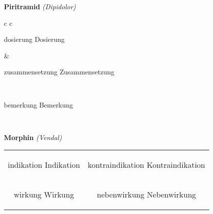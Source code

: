 \documentclass[12pt]{beamer}
\begin{document}
\begin{frame}{
    \textbf{Piritramid}
    \textit{(Dipidolor)}
}
    \begin{tabular}{c c}
        \begin{beamercolorbox}[wd=\boxwidth\textwidth,ht=\boxheight\textheight,sep=1em]{dosierung}
        Dosierung
        \end{beamercolorbox} & 
        \begin{beamercolorbox}[wd=\boxwidth\textwidth,ht=\boxheight\textheight,sep=1em]{zusammensetzung}
        Zusammensetzung
        \end{beamercolorbox} \\
        \begin{beamercolorbox}[wd=\textwidth,ht=\boxheight\textheight,sep=1em]{bemerkung}
        Bemerkung
        \end{beamercolorbox} \\
    \end{tabular}
\end{frame}

\begin{frame}{
    \textbf{Morphin}
    \textit{(Vendal)}
}
    \begin{tabular}{c c}
        \begin{beamercolorbox}[wd=\boxwidth\textwidth,ht=\boxheight\textheight,sep=1em]{indikation}
        Indikation
        \end{beamercolorbox} & 
        \begin{beamercolorbox}[wd=\boxwidth\textwidth,ht=\boxheight\textheight,sep=1em]{kontraindikation}
        Kontraindikation 
        \end{beamercolorbox} \\
        \begin{beamercolorbox}[wd=\boxwidth\textwidth,ht=\boxheight\textheight,sep=1em]{wirkung}
        Wirkung
        \end{beamercolorbox} & 
        \begin{beamercolorbox}[wd=\boxwidth\textwidth,ht=\boxheight\textheight,sep=1em]{nebenwirkung}
        Nebenwirkung
        \end{beamercolorbox} \\
    \end{tabular}
\end{frame}
\end{document}
